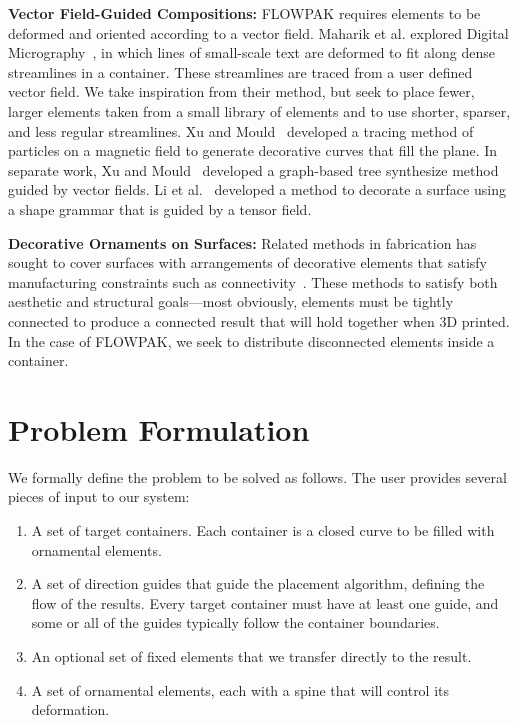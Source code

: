 \newtext
{
\textbf{Vector Field-Guided Compositions:} 
FLOWPAK requires elements to be deformed and oriented according to a vector field.
Maharik et al. explored Digital Micrography~\cite{Maharik2011}, in which
lines of small-scale text are deformed to fit along dense streamlines in a container.
These streamlines are traced from a user defined vector field.
We take inspiration from their method, but seek to place fewer,
larger elements taken from a small library of elements and to use shorter, sparser, and less regular streamlines. 
Xu and Mould~\cite{Xu2009} developed a tracing method of particles on a magnetic field to
generate decorative curves that fill the plane.
In separate work, Xu and Mould~\cite{Xu2015} developed a graph-based tree synthesize method guided by vector fields.
Li et al.~\cite{Li2010} developed a method to decorate a surface using a shape grammar that is guided by a tensor field.
}

\newtext
{
\textbf{Decorative Ornaments on Surfaces:} 
Related methods in fabrication has sought to cover surfaces with
arrangements of decorative elements that satisfy manufacturing
constraints such as connectivity~\cite{Chen2016, Zehnder2016, Bian2018, Martinez2019}.
These methods to satisfy both aesthetic and structural
goals---most obviously, elements must be tightly connected to produce a connected result
that will hold together when 3D printed.
In the case of FLOWPAK, we seek to distribute disconnected elements inside a container.
}


\section{Problem Formulation}
\label{flowpak_problem_formulation}

We formally define the problem to be solved as follows.  The user provides several pieces of input
to our system:
\begin{enumerate}
      \item A set of target containers.
            Each container 
			is a closed curve to be filled with ornamental elements.
      \item A set of direction guides
      		that guide the placement algorithm, defining the flow of the results. 
      		Every target container must have at least one guide, and some or
      		all of the guides typically follow the container boundaries.
      \item An optional set of fixed elements that we transfer directly to the result.
      \item A set of ornamental elements, each with a spine that will control
            its deformation.
\end{enumerate}

